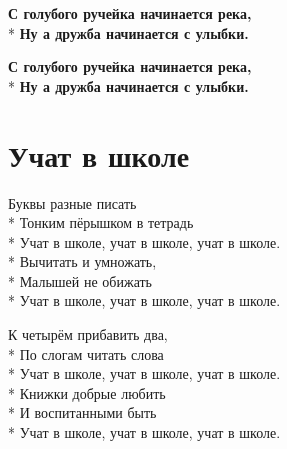 \medskip

\begin{minipage}{\linewidth}
\hspace*{1.5em}\textbf{С голубого ручейка начинается река,}\\*
\hspace*{1.5em}\textbf{Ну а дружба начинается с улыбки.}\\
\end{minipage}\par\medskip\nobreak

\medskip

\begin{minipage}{\linewidth}
\hspace*{1.5em}\textbf{С голубого ручейка начинается река,}\\*
\hspace*{1.5em}\textbf{Ну а дружба начинается с улыбки.}\\
\end{minipage}

\vspace{\fill}\newpage

\section{Учат в школе}
\label{song:Учат_в_школе}

\begin{minipage}{\linewidth}
Буквы разные писать\\*
Тонким пёрышком в тетрадь\\*
\hspace*{1.5em}Учат в школе, учат в школе, учат в школе.\\*
Вычитать и умножать,\\*
Малышей не обижать\\*
\hspace*{1.5em}Учат в школе, учат в школе, учат в школе.\\
\end{minipage}\par\medskip\nobreak

\medskip

\begin{minipage}{\linewidth}
К четырём прибавить два,\\*
По слогам читать слова\\*
\hspace*{1.5em}Учат в школе, учат в школе, учат в школе.\\*
Книжки добрые любить\\*
И воспитанными быть\\*
\hspace*{1.5em}Учат в школе, учат в школе, учат в школе.\\
\end{minipage}\par\medskip\nobreak


